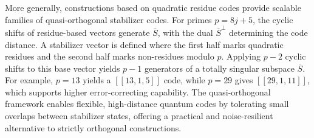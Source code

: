 \documentclass{iopjournal}
\theoremstyle{thmstyleone}%
\theoremstyle{thmstyletwo}%
\theoremstyle{thmstylethree}%
\begin{document}
More generally, constructions based on quadratic residue codes provide scalable families of quasi-orthogonal stabilizer codes. For primes $p = 8j + 5$, the cyclic shifts of residue-based vectors generate $\overline{S}$, with the dual $\overline{S}^\perp$ determining the code distance. A stabilizer vector is defined where the first half marks quadratic residues and the second half marks non-residues modulo \( p \). Applying \( p - 2 \) cyclic shifts to this base vector yields \( p - 1 \) generators of a totally singular subspace \( \overline{S} \). For example, $p=13$ yields a $[[13,1,5]]$ code, while $p=29$ gives $[[29,1,11]]$, which supports higher error-correcting capability. The quasi-orthogonal framework enables flexible, high-distance quantum codes by tolerating small overlaps between stabilizer states, offering a practical and noise-resilient alternative to strictly orthogonal constructions.
 
\end{document}
